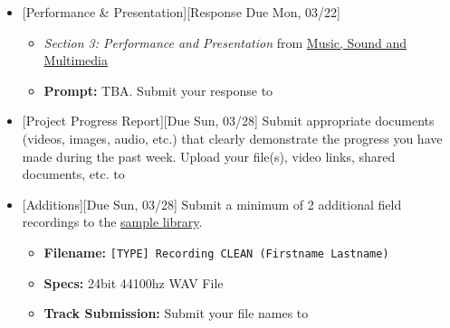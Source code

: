 \def\dMon{Mon, 03/22}
\def\dTues{Tues, 03/23}
\def\dWed{Wed, 03/24}
\def\dThur{Thur, 03/25}
\def\dFri{Fri, 03/26}
\def\dSat{Sat, 03/27}
\def\dSun{Sun, 03/28}
\placeDate

\begin{itemize}[noitemsep,topsep=0pt,leftmargin=*]
    \item {}[Performance \& Presentation][Response Due \dMon]
          \begin{itemize}
              \item \emph{Section 3: Performance and Presentation} from \href{supplements/Music_Sound_and_Multimedia_-_From_the_Live_to_the_Virtual_(Music_and_the_Moving_Image)_(2008).pdf}{Music, Sound and Multimedia}
              \item \textbf{Prompt:} TBA. Submit your response to \discordR
          \end{itemize}
    \item {}[Project Progress Report][Due \dSun] \newline
          Submit appropriate documents (videos, images, audio, etc.) that clearly demonstrate the progress you have made during the past week. Upload your file(s), video links, shared documents, etc. to \discordE
    \item {}[Additions][Due \dSun] \newline
          Submit a minimum of 2 additional field recordings to the \href{\samplelibPermURL}{sample library}.
          \begin{itemize}
              \item \textbf{Filename:} \texttt{[TYPE] Recording CLEAN (Firstname Lastname)}
              \item \textbf{Specs:} 24bit 44100hz WAV File
              \item \textbf{Track Submission:} Submit your file names to \discordS
          \end{itemize}
\end{itemize}